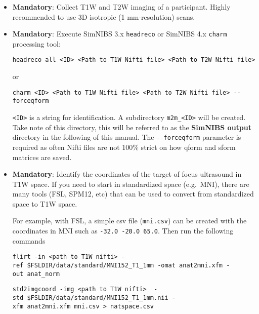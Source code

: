 \begin{itemize}
\item
  \textbf{Mandatory}: Collect T1W and T2W imaging of a participant.
  Highly recommended to use 3D isotropic (1 mm-resolution) scans.
\item
  \textbf{Mandatory}: Execute SimNIBS 3.x \texttt{headreco} or SimNIBS
  4.x \texttt{charm} processing tool:

\begin{verbatim}
headreco all <ID> <Path to T1W Nifti file> <Path to T2W Nifti file>
\end{verbatim}

  or

\begin{verbatim}
charm <ID> <Path to T1W Nifti file> <Path to T2W Nifti file> --forceqform
\end{verbatim}

  \texttt{\textless{}ID\textgreater{}} is a string for identification. A
  subdirectory \texttt{m2m\_\textless{}ID\textgreater{}} will be
  created. Take note of this directory, this will be referred to as the
  \textbf{SimNIBS output} directory in the following of this manual. The
  \texttt{-\/-forceqform} parameter is required as often Nifti files are
  not 100\% strict on how qform and sform matrices are saved.
\item
  \textbf{Mandatory}: Identify the coordinates of the target of focus
  ultrasound in T1W space. If you need to start in standardized space
  (e.g.~MNI), there are many tools (FSL, SPM12, etc) that can be used to
  convert from standardized space to T1W space.

  For example, with FSL, a simple csv file (\texttt{mni.csv}) can be
  created with the coordinates in MNI such as
  \texttt{-32.0\ -20.0\ 65.0}. Then run the following commands

  \texttt{flirt\ -in\ \textless{}path\ to\ T1W\ nifti\textgreater{}\ -ref\ \$FSLDIR/data/standard/MNI152\_T1\_1mm\ -omat\ anat2mni.xfm\ -out\ anat\_norm}

  \texttt{std2imgcoord\ -img\ \textless{}path\ to\ T1W\ nifti\textgreater{}\ \ -std\ \$FSLDIR/data/standard/MNI152\_T1\_1mm.nii\ -xfm\ anat2mni.xfm\ mni.csv\ \textgreater{}\ natspace.csv}


\end{itemize}
